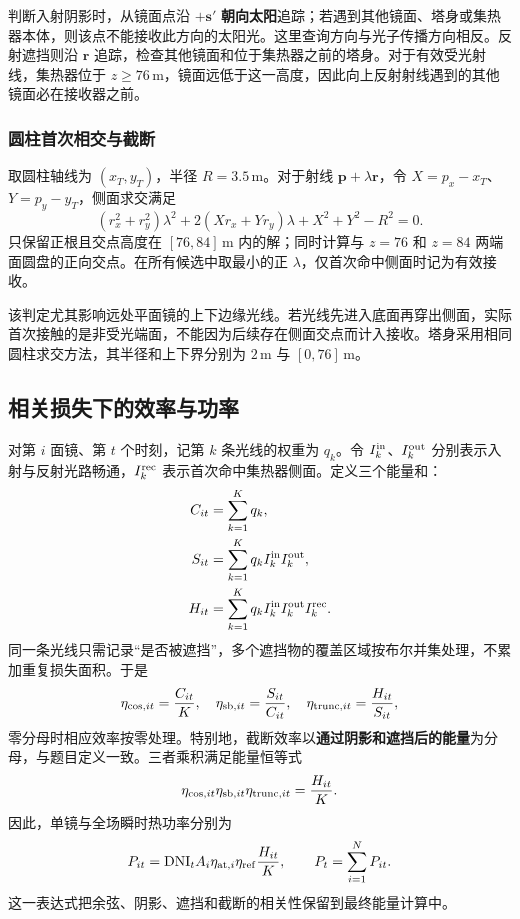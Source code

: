 \documentclass[UTF8,a4paper,zihao=-4,fontset=mac]{ctexart}
\newcommand{\vect}[1]{\bm{#1}}
\newcommand{\DNI}{\mathrm{DNI}}
\begin{document}
判断入射阴影时，从镜面点沿 $+\vect s'$ \textbf{朝向太阳}追踪；若遇到其他镜面、塔身或集热器本体，则该点不能接收此方向的太阳光。这里查询方向与光子传播方向相反。反射遮挡则沿 $\vect r$ 追踪，检查其他镜面和位于集热器之前的塔身。对于有效受光射线，集热器位于 $z\ge76\,\mathrm m$，镜面远低于这一高度，因此向上反射射线遇到的其他镜面必在接收器之前。

\subsubsection{圆柱首次相交与截断}
取圆柱轴线为 $(x_T,y_T)$，半径 $R=3.5\,\mathrm m$。对于射线 $\vect p+\lambda\vect r$，令 $X=p_x-x_T$、$Y=p_y-y_T$，侧面求交满足
\begin{equation}
(r_x^2+r_y^2)\lambda^2+2(Xr_x+Yr_y)\lambda+X^2+Y^2-R^2=0.
\end{equation}
只保留正根且交点高度在 $[76,84]\,\mathrm m$ 内的解；同时计算与 $z=76$ 和 $z=84$ 两端面圆盘的正向交点。在所有候选中取最小的正 $\lambda$，仅首次命中侧面时记为有效接收。

该判定尤其影响远处平面镜的上下边缘光线。若光线先进入底面再穿出侧面，实际首次接触的是非受光端面，不能因为后续存在侧面交点而计入接收。塔身采用相同圆柱求交方法，其半径和上下界分别为 $2\,\mathrm m$ 与 $[0,76]\,\mathrm m$。

\subsection{相关损失下的效率与功率}
对第 $i$ 面镜、第 $t$ 个时刻，记第 $k$ 条光线的权重为 $q_k$。令 $I_k^{\rm in}$、$I_k^{\rm out}$ 分别表示入射与反射光路畅通，$I_k^{\rm rec}$ 表示首次命中集热器侧面。定义三个能量和：
\begin{align}
C_{it}&=\sum_{k=1}^{K}q_k,\\
S_{it}&=\sum_{k=1}^{K}q_kI_k^{\rm in}I_k^{\rm out},\\
H_{it}&=\sum_{k=1}^{K}q_kI_k^{\rm in}I_k^{\rm out}I_k^{\rm rec}.
\end{align}
同一条光线只需记录“是否被遮挡”，多个遮挡物的覆盖区域按布尔并集处理，不累加重复损失面积。于是
\begin{equation}
\eta_{{\rm cos},it}=\frac{C_{it}}{K},\quad
\eta_{{\rm sb},it}=\frac{S_{it}}{C_{it}},\quad
\eta_{{\rm trunc},it}=\frac{H_{it}}{S_{it}},
\label{eq:eta}
\end{equation}
零分母时相应效率按零处理。特别地，截断效率以\textbf{通过阴影和遮挡后的能量}为分母，与题目定义一致。三者乘积满足能量恒等式
\begin{equation}
\eta_{{\rm cos},it}\eta_{{\rm sb},it}\eta_{{\rm trunc},it}=\frac{H_{it}}{K}.
\end{equation}
因此，单镜与全场瞬时热功率分别为
\begin{equation}
P_{it}=\DNI_t A_i\eta_{{\rm at},i}\eta_{\rm ref}\frac{H_{it}}{K},
\qquad P_t=\sum_{i=1}^{N}P_{it}.
\label{eq:power}
\end{equation}
这一表达式把余弦、阴影、遮挡和截断的相关性保留到最终能量计算中。
\end{document}
